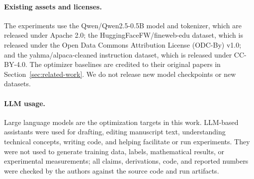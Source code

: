 \documentclass{article}
\begin{document}
\paragraph{Existing assets and licenses.}
The experiments use the Qwen/Qwen2.5-0.5B model and tokenizer, which are released under Apache 2.0; the HuggingFaceFW/fineweb-edu dataset, which is released under the Open Data Commons Attribution License (ODC-By) v1.0; and the yahma/alpaca-cleaned instruction dataset, which is released under CC-BY-4.0. The optimizer baselines are credited to their original papers in Section~\ref{sec:related-work}. We do not release new model checkpoints or new datasets.

\paragraph{LLM usage.}
Large language models are the optimization targets in this work. LLM-based assistants were used for drafting, editing manuscript text, understanding technical concepts, writing code, and helping facilitate or run experiments. They were not used to generate training data, labels, mathematical results, or experimental measurements; all claims, derivations, code, and reported numbers were checked by the authors against the source code and run artifacts.
\end{document}
